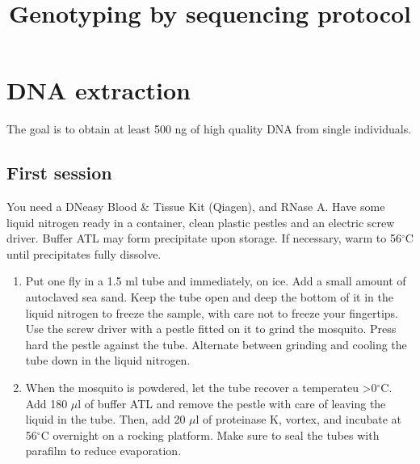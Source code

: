 \documentclass[a4paper,12pt]{article}
\title{Genotyping by sequencing protocol}
\begin{document}
\maketitle
\section{DNA extraction}
The goal is to obtain at least 500 ng of high quality DNA from single individuals. 
\subsection{First session}
You need a DNeasy Blood \& Tissue Kit (Qiagen), and RNase A. Have some liquid nitrogen ready in a container, clean plastic pestles and an electric screw driver. Buffer ATL may form precipitate upon storage. If necessary, warm to 56$^\circ$C until precipitates fully dissolve.
\begin{enumerate}
\item Put one fly in a 1.5 ml tube and immediately, on ice. Add a small amount of autoclaved sea sand. Keep the tube open and deep the bottom of it in the liquid nitrogen to freeze the sample, with care not to freeze your fingertips. Use the screw driver with a pestle fitted on it to grind the mosquito. Press hard the pestle against the tube. Alternate between grinding and cooling the tube down in the liquid nitrogen.
\item When the mosquito is powdered, let the tube recover a temperateu >0$^\circ$C. Add 180 $\mu$l of buffer ATL and remove the pestle with care of leaving the liquid in the tube. Then, add 20 $\mu$l of proteinase K, vortex, and incubate at 56$^\circ$C overnight on a rocking platform. Make sure to seal the tubes with parafilm to reduce evaporation.
\end{enumerate}
\end{document}
